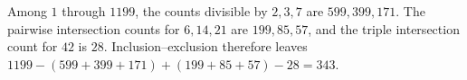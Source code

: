 Among $1$ through $1199$, the counts divisible by $2,3,7$ are $599,399,171$. The pairwise intersection counts for $6,14,21$ are $199,85,57$, and the triple intersection count for $42$ is $28$. Inclusion--exclusion therefore leaves $1199-(599+399+171)+(199+85+57)-28=\boxed{343}$.
